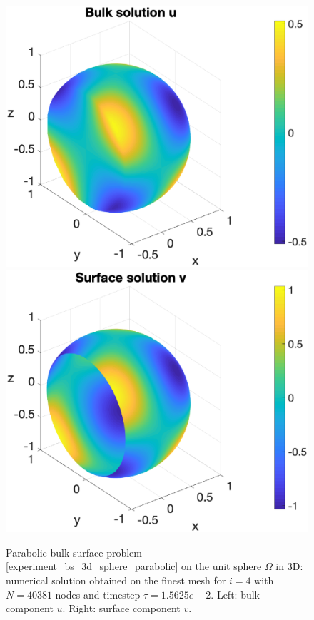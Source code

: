 \documentclass[a4paper]{article}
\begin{document}
\begin{figure}[H]
\begin{center}
\hspace*{-10mm}
\includegraphics[scale=0.4]{bs_3d_sphere_nx41_parabolic_u.eps}
\hspace*{-5mm}
\includegraphics[scale=0.4]{bs_3d_sphere_nx41_parabolic_v.eps}
\end{center}
\caption{Parabolic bulk-surface  problem \eqref{experiment_bs_3d_sphere_parabolic} on the unit sphere $\Omega$ in 3D: numerical solution obtained on the finest mesh for $i=4$ with $N= 40381$ nodes and timestep $\tau = 1.5625e-2$. Left: bulk component $u$. Right: surface component $v$.}
\label{fig:bs_3d_numsol_sphere_parabolic}
\end{figure} 
\end{document}

